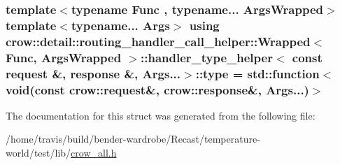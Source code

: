 \hypertarget{structcrow_1_1detail_1_1routing__handler__call__helper_1_1_wrapped_1_1handler__type__helper_3_01506e35faa94646c63b5476ce8ce1df0a_a904d9c36f422d22baad0484a878c0e06}{
\subsubsection[{type}]{\setlength{\rightskip}{0pt plus 5cm}template$<$typename Func , typename... Args\-Wrapped$>$ template$<$typename... Args$>$ using {\bf crow\-::detail\-::routing\-\_\-handler\-\_\-call\-\_\-helper\-::\-Wrapped}$<$ Func, Args\-Wrapped $>$\-::{\bf handler\-\_\-type\-\_\-helper}$<$ const {\bf request} \&, {\bf response} \&, Args...$>$\-::{\bf type} =  std\-::function$<$void(const {\bf crow\-::request}\&, {\bf crow\-::response}\&, Args...)$>$}}\label{structcrow_1_1detail_1_1routing__handler__call__helper_1_1_wrapped_1_1handler__type__helper_3_01506e35faa94646c63b5476ce8ce1df0a_a904d9c36f422d22baad0484a878c0e06}


The documentation for this struct was generated from the following file\-:\begin{DoxyCompactItemize}
\item 
/home/travis/build/bender-\/wardrobe/\-Recast/temperature-\/world/test/lib/\hyperlink{crow__all_8h}{crow\-\_\-all.\-h}\end{DoxyCompactItemize}
